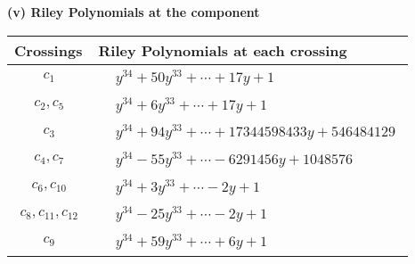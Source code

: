 \documentclass[1p]{elsarticle_modified}
\theoremstyle{definition}
\begin{document}
\flushleft \textbf{(v) Riley Polynomials at the component}\newline \\
\begin{tabular}{m{50pt}|m{274pt}}
Crossings & \hspace{64pt}Riley Polynomials at each crossing \\
\hline $$\begin{aligned}c_{1}\end{aligned}$$&$\begin{aligned}
&y^{34}+50 y^{33}+\cdots+17 y+1
\end{aligned}$\\
\hline $$\begin{aligned}c_{2},c_{5}\end{aligned}$$&$\begin{aligned}
&y^{34}+6 y^{33}+\cdots+17 y+1
\end{aligned}$\\
\hline $$\begin{aligned}c_{3}\end{aligned}$$&$\begin{aligned}
&y^{34}+94 y^{33}+\cdots+17344598433 y+546484129
\end{aligned}$\\
\hline $$\begin{aligned}c_{4},c_{7}\end{aligned}$$&$\begin{aligned}
&y^{34}-55 y^{33}+\cdots-6291456 y+1048576
\end{aligned}$\\
\hline $$\begin{aligned}c_{6},c_{10}\end{aligned}$$&$\begin{aligned}
&y^{34}+3 y^{33}+\cdots-2 y+1
\end{aligned}$\\
\hline $$\begin{aligned}c_{8},c_{11},c_{12}\end{aligned}$$&$\begin{aligned}
&y^{34}-25 y^{33}+\cdots-2 y+1
\end{aligned}$\\
\hline $$\begin{aligned}c_{9}\end{aligned}$$&$\begin{aligned}
&y^{34}+59 y^{33}+\cdots+6 y+1
\end{aligned}$\\
\hline
\end{tabular}\\~\\
\end{document}
